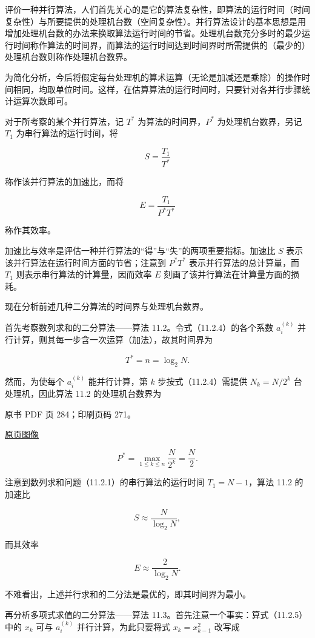 评价一种并行算法，人们首先关心的是它的算法复杂性，即算法的运行时间（时间复杂性）与所要提供的处理机台数（空间复杂性）。并行算法设计的基本思想是用增加处理机台数的办法来换取算法运行时间的节省。处理机台数充分多时的最少运行时间称作算法的时间界，而算法的运行时间达到时间界时所需提供的（最少的）处理机台数则称作处理机台数界。

为简化分析，今后将假定每台处理机的算术运算（无论是加减还是乘除）的操作时间相同，均取单位时间。这样，在估算算法的运行时间时，只要针对各并行步骤统计运算次数即可。

对于所考察的某个并行算法，记 \(T^*\) 为算法的时间界，\(P^*\) 为处理机台数界，另记 \(T_1\) 为串行算法的运行时间，将

\[
S=\frac{T_1}{T^*}
\]

称作该并行算法的加速比，而将

\[
E=\frac{T_1}{P^*T^*}
\]

称作其效率。

加速比与效率是评估一种并行算法的``得''与``失''的两项重要指标。加速比 \(S\) 表示该并行算法在运行时间方面的节省；注意到 \(P^*T^*\) 表示并行算法的总计算量，而 \(T_1\) 则表示串行算法的计算量，因而效率 \(E\) 刻画了该并行算法在计算量方面的损耗。

现在分析前述几种二分算法的时间界与处理机台数界。

首先考察数列求和的二分算法------算法 11.2。令式（11.2.4）的各个系数 \(a_i^{(k)}\) 并行计算，则其每一步含一次运算（加法），故其时间界为

\[
T^*=n=\log_2 N.
\]

然而，为使每个 \(a_i^{(k)}\) 能并行计算，第 \(k\) 步按式（11.2.4）需提供 \(N_k=N/2^k\) 台处理机，因此算法 11.2 的处理机台数界为

\clearpage

原书 PDF 页 284；印刷页码 271。

\href{source-images/pdf-284.jpeg}{原页图像}

\[
P^*=\max_{1\le k\le n}\frac{N}{2^k}=\frac{N}{2}.
\]

注意到数列求和问题（11.2.1）的串行算法的运行时间 \(T_1=N-1\)，算法 11.2 的加速比

\[
S\approx\frac{N}{\log_2 N},
\]

而其效率

\[
E\approx\frac{2}{\log_2 N}.
\]

不难看出，上述并行求和的二分法是最优的，即其时间界为最小。

再分析多项式求值的二分算法------算法 11.3。首先注意一个事实：算式（11.2.5）中的 \(x_k\) 可与 \(a_i^{(k)}\) 并行计算，为此只要将式 \(x_k=x_{k-1}^2\) 改写成

